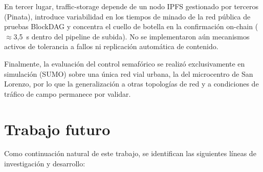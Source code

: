 En tercer lugar, traffic-storage depende de un nodo IPFS gestionado por terceros
(Pinata), introduce variabilidad en los tiempos de minado de la red pública de pruebas
BlockDAG y concentra el cuello de botella en la confirmación on-chain ($\approx$3,5~s dentro
del pipeline de subida). No se implementaron aún mecanismos activos de tolerancia a fallos ni
replicación automática de contenido.

Finalmente, la evaluación del control semafórico se realizó exclusivamente en simulación
(SUMO) sobre una única red vial urbana, la del microcentro de San Lorenzo, por lo que la
generalización a otras topologías de red y a condiciones de tráfico de campo permanece por
validar.

\section{Trabajo futuro}

Como continuación natural de este trabajo, se identifican las siguientes líneas de investigación
y desarrollo:

